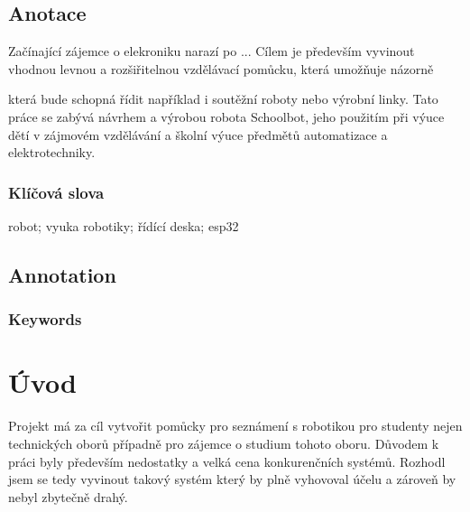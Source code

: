 \documentclass{template/socthesis}
\author{Tomas Vavrinec}
\begin{document}
\maketitle



\pagestyle{empty}

\section*{Anotace}
Začínající zájemce o elekroniku narazí po ...
Cílem je především vyvinout vhodnou levnou a rozšiřitelnou vzdělávací pomůcku, která umožňuje názorně  

která bude schopná řídit například i soutěžní roboty nebo výrobní linky.
Tato práce se zabývá návrhem a výrobou robota Schoolbot, jeho použitím při výuce dětí v zájmovém vzdělávání a školní výuce předmětů automatizace a elektrotechniky. 



\subsection*{Klíčová slova}
robot; vyuka robotiky; řídící deska; esp32

\vspace{20mm}

\section*{Annotation}

\subsection*{Keywords}

\newpage
\pagestyle{plain}

\tableofcontents %

\setcounter{figure}{0}
\setcounter{table}{0}
\newpage

\chapter*{Úvod}
Projekt má za cíl vytvořit pomůcky pro seznámení s robotikou pro studenty nejen technických oborů případně pro zájemce o studium tohoto oboru. Důvodem k práci byly především nedostatky a velká cena konkurenčních systémů. Rozhodl jsem se tedy vyvinout takový systém který by plně vyhovoval účelu a zároveň by nebyl zbytečně drahý.
\end{document}
